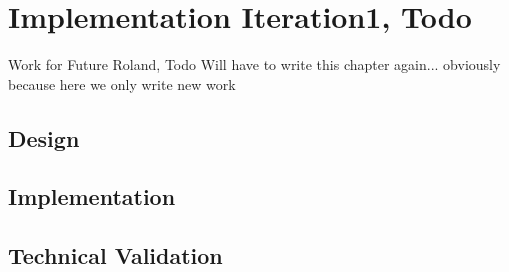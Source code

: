 \section{Implementation Iteration1, Todo}
Work for Future Roland, Todo
Will have to write this chapter again... obviously because here we only write new work
\subsection{Design}
\subsection{Implementation}
\subsection{Technical Validation}
